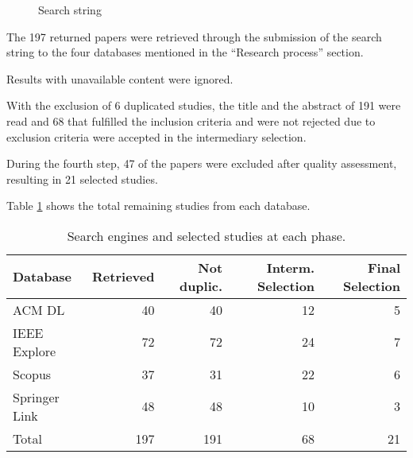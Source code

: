\begin{figure}[!ht]
  \centering
  \caption{Search string}
  \label{fig:searchstring}
\end{figure}
	
The 197 returned papers were retrieved through the submission of the search string to the four databases mentioned in the “Research process” section.

Results with unavailable content were ignored.

With the exclusion of 6 duplicated studies, the title and the abstract of 191 were read and 68 that fulfilled the inclusion criteria and were not rejected due to exclusion criteria were accepted in the intermediary selection.

During the fourth step, 47 of the papers were excluded after quality assessment, resulting in 21 selected studies.

Table 
\ref{tab:results}
shows the total remaining studies from each database.


\begin{table}[h]
    \begin{tabular}{l r r r r}
    \hline
    Database &        Retrieved & 
                                Not duplic. & 
                                         Interm. Selection & 
                                               Final Selection\\
    \hline
    ACM	DL			& 40 &      40 &     12  & 5 \\
    IEEE Explore	& 72 &      72 &     24  & 7 \\
    Scopus			& 37 &      31 &     22  & 6 \\
    Springer Link	& 48 &      48 &     10  & 3 \\
    \hline
    Total           & 197 &    191 &     68  & 21 \\
    \hline
    
    \end{tabular}
    \caption{Search engines and selected studies at each phase.}\label{tab:results}
\end{table}

